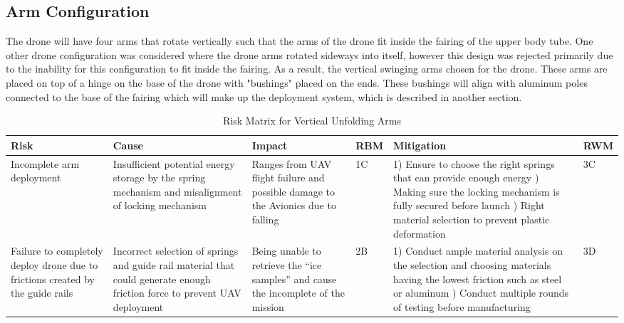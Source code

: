 		\subsection{Arm Configuration}
			The drone will have four arms that rotate vertically such that the arms of the drone fit inside the fairing of the upper body tube. One other drone configuration was considered where the drone arms rotated sideways into itself, however this design was rejected primarily due to the inability for this configuration to fit inside the fairing. As a result, the vertical swinging arms chosen for the drone. These arms are placed on top of a hinge on the base of the drone with "bushings" placed on the ends. These bushings will align with aluminum poles connected to the base of the fairing which will make up the deployment system, which is described in another section.
			\begin{table}[]
                \label{vertical unfolding arms}
                {\footnotesize
                \caption{Risk Matrix for Vertical Unfolding Arms}
                \centering
                \begin{tabularx}{\linewidth}{XXXlXl}
                \toprule
                \textbf{Risk}                                            & \textbf{Cause}                                                                                                                 & \textbf{Impact}                                                                                                                           & \textbf{RBM}  & \textbf{Mitigation}                                                                                                                                                                                     & \textbf{RWM} \\
                \midrule
                Incomplete arm deployment & Insufficient potential energy storage by the spring mechanism and misalignment of locking mechanism & Ranges from UAV flight failure and possible damage to the Avionics due to falling & \cellcolor{red!25} 1C & 1) Ensure to choose the right springs that can provide enough energy \newline 2) Making sure the locking mechanism is fully secured before launch \newline 3) Right material selection to prevent plastic deformation & \cellcolor{orange!25} 3C \\
                Failure to completely deploy drone due to frictions created by the guide rails & Incorrect selection of springs and guide rail material that could generate enough friction force to prevent UAV deployment & Being unable to retrieve the “ice samples” and cause the incomplete of the mission & \cellcolor{red!25} 2B & 1) Conduct ample material analysis on the selection and choosing materials having the lowest friction such as steel or aluminum \newline 2) Conduct multiple rounds of testing before manufacturing & \cellcolor{green!25} 3D \\

\end{tabularx}}
\end{table}
